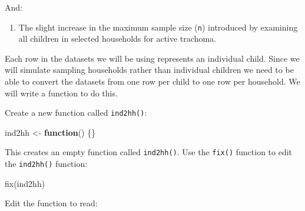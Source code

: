 \documentclass[
  12pt,
  a4paper]{book}
\newenvironment{Shaded}{\begin{snugshade}}{\end{snugshade}}
\newcommand{\ConstantTok}[1]{\textcolor[rgb]{0.00,0.00,0.00}{#1}}
\newcommand{\ControlFlowTok}[1]{\textcolor[rgb]{0.13,0.29,0.53}{\textbf{#1}}}
\newcommand{\FunctionTok}[1]{\textcolor[rgb]{0.00,0.00,0.00}{#1}}
\newcommand{\NormalTok}[1]{#1}
\newcommand{\OtherTok}[1]{\textcolor[rgb]{0.56,0.35,0.01}{#1}}
\newcommand{\SpecialCharTok}[1]{\textcolor[rgb]{0.00,0.00,0.00}{#1}}
\providecommand{\tightlist}{%
  \setlength{\itemsep}{0pt}\setlength{\parskip}{0pt}}
\begin{document}
And:

\begin{enumerate}
\def\labelenumi{\arabic{enumi}.}
\setcounter{enumi}{1}
\tightlist
\item
  The slight increase in the maximum sample size (\texttt{n}) introduced by examining all children in selected households for active trachoma.
\end{enumerate}

Each row in the datasets we will be using represents an individual child. Since we will simulate sampling households rather than individual children we need to be able to convert the datasets from one row per child to one row per household. We will write a function to do this.

Create a new function called \texttt{ind2hh()}:

\begin{Shaded}
\begin{Highlighting}[]
\NormalTok{ind2hh }\OtherTok{\textless{}{-}} \ControlFlowTok{function}\NormalTok{() \{\}}
\end{Highlighting}
\end{Shaded}

This creates an empty function called \texttt{ind2hh()}. Use the \texttt{fix()} function to edit the \texttt{ind2hh()} function:

\begin{Shaded}
\begin{Highlighting}[]
\FunctionTok{fix}\NormalTok{(ind2hh)}
\end{Highlighting}
\end{Shaded}

Edit the function to read:

\begin{Shaded}
\end{Shaded}
\end{document}
